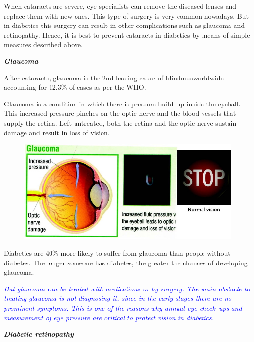 When cataracts are severe, eye specialists can remove the diseased lenses and replace them with new ones. This type of surgery is very common nowadays. But in diabetics this surgery can result in other complications such as glaucoma and retinopathy. Hence, it is best to prevent cataracts in diabetics by means of simple measures described above.

\clearpage
\noindent\textbf{\textit{Glaucoma}}

After cataracts, glaucoma is the 2nd leading cause of blindness\break worldwide accounting for 12.3\% of cases as per the WHO.

Glaucoma is a condition in which there is pressure build–up inside the eyeball. This increased pressure pinches on the optic nerve and the blood vessels that supply the retina. Left untreated, both the retina and the optic nerve sustain damage and result in loss of vision.

\begin{figure}[h]
\centering
\includegraphics[scale=2.2]{images/051.jpg}
\end{figure}

Diabetics are 40\% more likely to suffer from glaucoma than people without diabetes. The longer someone has diabetes, the greater the chances of developing glaucoma.

\textcolor{blue}{\textit{But glaucoma can be treated with medications or by surgery. The main obstacle to treating glaucoma is not diagnosing it, since in the early stages there are no prominent symptoms. This is one of the reasons why annual eye check–ups and measurement of eye pressure are critical to protect vision in diabetics.}}

\noindent\textbf{\textit{Diabetic retinopathy}}

